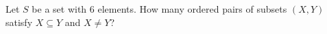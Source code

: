 Let $S$ be a set with $6$ elements. How many ordered pairs of subsets $(X,Y)$ satisfy $X\subseteq Y$ and $X\ne Y$?
